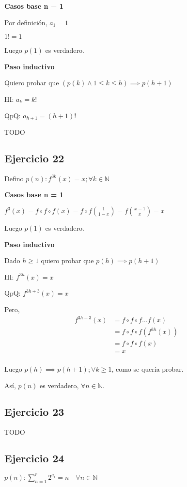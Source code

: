 \textbf{Casos base n = 1}

Por definición, $a_1 = 1$

$ 1! = 1$

Luego $ p(1)$ es verdadero.

\textbf{Paso inductivo}

Quiero probar que $(p(k) \wedge 1\leq k \leq h) \implies p(h+1)$

HI: $ a_k = k! $

QpQ: $ a_{h+1} = (h+1)!$

TODO

\subsection{Ejercicio 22}

Defino $ p(n): f^{3k}(x) = x; \forall k \in \mathbb{N} $

\textbf{Casos base n = 1}

$f^{3}(x) = f \circ f \circ f(x) = f \circ f(\frac{1}{1-x}) = f(\frac{x-1}{x}) = x$

Luego $ p(1) $ es verdadero.

\textbf{Paso inductivo}

Dado $ h\geq 1 $ quiero probar que $ p(h) \implies p(h+1) $

HI: $ f^{3h}(x) = x $

QpQ: $ f^{3h+3}(x) = x$

Pero,
\begin{align*}
   f^{3h+3}(x) &= f \circ f \circ f ... f(x) \\
   &= f \circ f \circ f (f^{3h}(x)) \\
   &= f \circ f \circ f (x) \\
   &= x \\
\end{align*}

Luego $p(h) \implies p(h+1); \forall k \geq 1$, como se quería probar.

Así, $p(n)$ es verdadero, $\forall n \in \mathbb{N}$.

\subsection{Ejercicio 23}
TODO

\subsection{Ejercicio 24}
$p(n): \sum_{n=1}^{r}2^{a_i} = n \quad \forall n \in \mathbb N$

